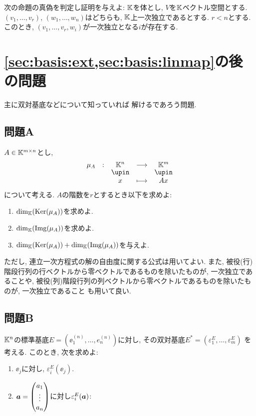 \begin{quiz}
  次の命題の真偽を判定し証明を与えよ:
$\mathbb{K}$を体とし,
  $V$を$\mathbb{K}$ベクトル空間とする.
  $(v_1,\ldots, v_r)$,
  $(w_1,\ldots, w_n)$はどちらも,
  $\mathbb{K}$上一次独立であるとする.
$r<n$とする.
  このとき,
$(v_1,\ldots,v_{r},w_{i})$が一次独立となる$i$が存在する.
\end{quiz}



%
\section{\cref{sec:basis:ext,sec:basis:linmap}の後の問題}
主に双対基底などについて知っていれば
解けるであろう問題.
\subsection{問題A}
\begin{quiz}
  $A\in\mathbb{K}^{m\times n}$とし,
  \begin{align*}
    \shazo{\mu_A}{\KK^n}{\KK^m}
    {x}{Ax}
  \end{align*}
  について考える.
  $A$の階数を$r$とするとき以下を求めよ:
  \begin{enumerate}
  \item $\dim_{\mathbb{K}}(\operatorname{Ker}(\mu_A))$を求めよ.
  \item $\dim_{\mathbb{K}}(\operatorname{Img}(\mu_A))$を求めよ.
  \item $\dim_{\mathbb{K}}(\operatorname{Ker}(\mu_A))+\dim_{\mathbb{K}}(\operatorname{Img}(\mu_A))$を与えよ.
  \end{enumerate}
  ただし,
  連立一次方程式の解の自由度に関する公式は用いてよい.
  また,
  被役(行)階段行列の行ベクトルから零ベクトルであるものを除いたものが,
  一次独立であることや,
  被役(列)階段行列の列ベクトルから零ベクトルであるものを除いたものが,
  一次独立であること
  も用いて良い.
\end{quiz}



\subsection{問題B}
\begin{quiz}
  $\mathbb{K}^n$の標準基底$E=(\ee^{(n)}_1,\ldots,e^{(n)}_n)$に対し,
  その双対基底$E^\ast=(\varepsilon_1^{E},\ldots,\varepsilon_m^{E})$
  を考える.
  このとき, 次を求めよ:
  \begin{enumerate}
    \item $\ee_j$に対し, $\varepsilon_i^{E}(\ee_j)$.
    \item $\boldsymbol{a}=\begin{pmatrix}a_1\\\vdots\\a_n\end{pmatrix}$に対し$\varepsilon_i^{E}(\boldsymbol{a})$:
  \end{enumerate}
\end{quiz}

